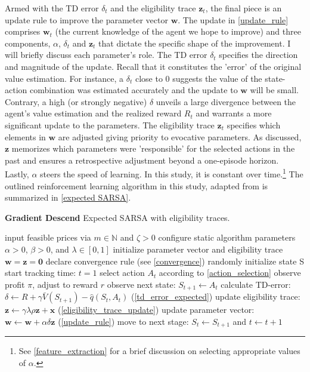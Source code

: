 Armed with the TD error $\delta_t$ and the eligibility trace $\boldsymbol{z}_t$, the final piece is an update rule to improve the parameter vector $\boldsymbol{w}$. The update in \autoref{update_rule} comprises $\boldsymbol{w}_t$  (the current knowledge of the agent we hope to improve) and three components, $\alpha$, $\delta_t$ and $\boldsymbol{z}_t$ that dictate the specific shape of the improvement. I will briefly discuss each parameter's role. The TD error $\delta_t$ specifies the direction and magnitude of the update. Recall that it constitutes the 'error' of the original value estimation. For instance, a $\delta_t$ close to 0 suggests the value of the state-action combination was estimated accurately and the update to $\boldsymbol{w}$ will be small. Contrary, a high (or strongly negative) $\delta$ unveils a large divergence between the agent's value estimation and the realized reward $R_t$ and warrants a more significant update to the parameters. The eligibility trace $\boldsymbol{z}_t$ specifies which elements in $\boldsymbol{w}$ are adjusted giving priority to evocative parameters. As discussed, $\boldsymbol{z}$ memorizes which parameters were 'responsible' for the selected actions in the past and ensures a retrospective adjustment beyond a one-episode horizon. Lastly, $\alpha$ steers the speed of learning. In this study, it is constant over time.\footnote{See \autoref{feature_extraction} for a brief discussion on selecting appropriate values of $\alpha$.} The outlined reinforcement learning algorithm in this study, adapted from \textcite{sutton_reinforcement_2018} is summarized in \autoref{expected SARSA}.

\begin{algorithm}
	\caption{\textbf{Gradient Descend} Expected SARSA with eligibility traces.}
	\begin{algorithmic}[testing]
		\label{expected SARSA}
		\small
		\STATE input feasible prices via $m \in \mathbb{N}$ and $\zeta > 0$
		\STATE configure static algorithm parameters $\alpha > 0$, $\beta > 0$, and $\lambda \in [0, 1]$
		\STATE initialize parameter vector and eligibility trace $\boldsymbol{w} = \boldsymbol{z} = \boldsymbol{0}$
		\STATE declare convergence rule (see \autoref{convergence})
		\STATE randomly initialize state S
		\STATE start tracking time: $t = 1$
		\STATE select action $A_t$ according to \autoref{action_selection}
		\STATE observe profit $\pi$, adjust to reward $r$
		\STATE observe next state: $S_{t+1} \leftarrow A_t$
		\STATE calculate TD-error: $\delta \leftarrow R +  \gamma \bar{V}(S_{t+1}) - \hat{q}(S_t, A_t)$ (\autoref{td_error_expected})
		\STATE update eligibility trace: $\boldsymbol{z} \leftarrow \gamma \lambda \rho \boldsymbol{z} + \boldsymbol{x} $ (\autoref{eligibility_trace_update})
		\STATE update parameter vector: $\boldsymbol{w} \leftarrow \boldsymbol{w} + \alpha  \delta  \boldsymbol{z}$ (\autoref{update_rule})
		\STATE move to next stage: $S_t \leftarrow S_{t+1}$ and $t \leftarrow t+1$
		\ENDWHILE
	\end{algorithmic}
\end{algorithm}

